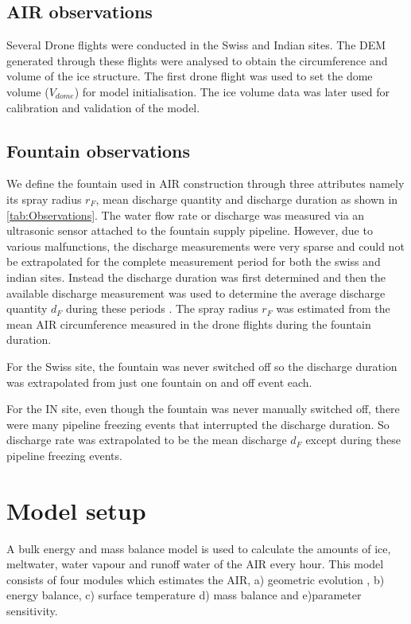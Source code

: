 \documentclass[utf8]{frontiersSCNS} %
\begin{document}
\subsection{AIR observations}
Several Drone flights were conducted in the Swiss and Indian sites. The DEM generated through these flights were
analysed to obtain the circumference and volume of the ice structure. The first drone flight was used to set the dome
volume ($V_{dome}$) for model initialisation. The ice volume data was later used for calibration and validation of the
model. 

\subsection{Fountain observations} 
We define the fountain used in AIR construction through three attributes namely its spray radius $r_F$, mean discharge
quantity and discharge duration as shown in \ref{tab:Observations}. The water flow rate or discharge was measured via an
ultrasonic sensor attached to the fountain supply pipeline.  However, due to various malfunctions, the discharge
measurements were very sparse and could not be extrapolated for the complete measurement period for both the swiss and
indian sites. Instead the discharge duration was first determined and then the available discharge measurement was used
to determine the average discharge quantity $d_F$ during these periods . The spray radius $r_F$ was estimated from the
mean AIR circumference measured in the drone flights during the fountain duration.  

For the Swiss site, the fountain was never switched off so the discharge duration was extrapolated from just one fountain
on and off event each.  

For the IN site, even though the fountain was never manually switched off, there were many pipeline freezing events that
interrupted the discharge duration. So discharge rate was extrapolated to be the mean discharge $d_F$ except during
these pipeline freezing events.

\section{Model setup}

A bulk energy and mass balance model is used to calculate the amounts of ice, meltwater, water vapour and runoff water
of the AIR every hour. This model consists of four modules which estimates the AIR, a) geometric evolution , b) energy
balance, c) surface temperature d) mass balance and e)parameter sensitivity. 
\end{document}
